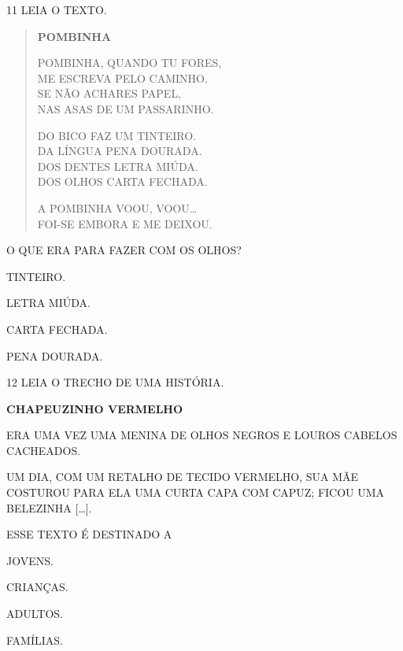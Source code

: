 \pagebreak

\num{11} LEIA O TEXTO.

\begin{myquote}
\begin{verse}
\textbf{POMBINHA}

POMBINHA, QUANDO TU FORES,\\
ME ESCREVA PELO CAMINHO.\\
SE NÃO ACHARES PAPEL,\\
NAS ASAS DE UM PASSARINHO.

DO BICO FAZ UM TINTEIRO.\\
DA LÍNGUA PENA DOURADA.\\
DOS DENTES LETRA MIÚDA.\\
DOS OLHOS CARTA FECHADA.

A POMBINHA VOOU, VOOU\ldots{}\\
FOI-SE EMBORA E ME DEIXOU.
\end{verse}
\end{myquote}

O QUE ERA PARA FAZER COM OS OLHOS?

\begin{multicols}{2}
\begin{escolha}[itemsep=0pt]
\item TINTEIRO.

\item LETRA MIÚDA.

\item CARTA FECHADA.

\item PENA DOURADA.
\end{escolha}
\end{multicols}

\num{12} LEIA O TRECHO DE UMA HISTÓRIA.

\begin{myquote}
\textbf{CHAPEUZINHO VERMELHO}

ERA UMA VEZ UMA MENINA DE OLHOS NEGROS E LOUROS CABELOS CACHEADOS.

UM DIA, COM UM RETALHO DE TECIDO VERMELHO, SUA MÃE
COSTUROU PARA ELA UMA CURTA CAPA COM CAPUZ; FICOU UMA
BELEZINHA [\ldots{}].

\end{myquote}

\pagebreak

ESSE TEXTO É DESTINADO A

\begin{escolha}%
\item JOVENS.

\item CRIANÇAS.

\item ADULTOS.

\item FAMÍLIAS.
\end{escolha}

